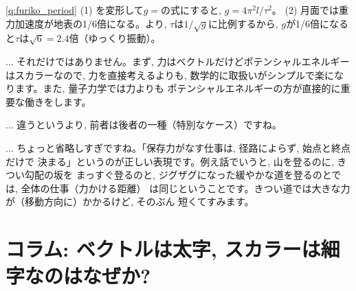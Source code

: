 \ref{q:furiko_period}
(1) を変形して$g=$の式にすると, 
$g=4\pi^2l/\tau^2$。
(2) 月面では重力加速度が地表の1/6倍になる。より, 
$\tau$は$1/\sqrt{g}$に比例するから, $g$が1/6倍になると$\tau$は$\sqrt{6}=2.4$倍（ゆっくり振動）。
\mv


\begin{faq}{\small{} ... 
それだけではありません。まず, 力はベクトルだけどポテンシャルエネルギーはスカラーなので, 
力を直接考えるよりも, 数学的に取扱いがシンプルで楽になります。また, 量子力学では力よりも
ポテンシャルエネルギーの方が直接的に重要な働きをします。}\end{faq}

\begin{faq}{\small{} ... 違うというより, 
前者は後者の一種（特別なケース）ですね。}\end{faq}

\begin{faq}{\small{} ... 
ちょっと省略しすぎですね。「保存力がなす仕事は, 径路によらず, 始点と終点だけで
決まる」というのが正しい表現です。例え話でいうと, 山を登るのに, きつい勾配の坂を
まっすぐ登るのと, ジグザグになった緩やかな道を登るのとでは, 全体の仕事（力かける距離）
は同じということです。きつい道では大きな力が（移動方向に）かかるけど, そのぶん
短くてすみます。}\end{faq}

\section*{コラム: ベクトルは太字, スカラーは細字なのはなぜか?}

